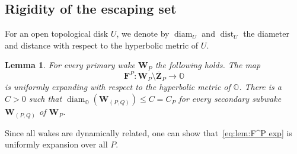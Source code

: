 \documentclass{amsart}
\newcommand{\1}{{\mathbb 1 }}
\newcommand{\bO}{{\mathbb{O}}}
\newcommand{\bF}{{\mathbf F}}
\newcommand{\bZ}{{\mathbf Z}}
\newcommand{\bW}{{\mathbf W}}
\newtheorem{lem}[thm]{Lemma}
\theoremstyle{remark}
\numberwithin{equation}{section}
\theoremstyle{definition}
\newcommand{\diam}{\operatorname{diam}}
\newcommand{\dist}{\operatorname{dist}}
\theoremstyle{nonumberbreak}
\begin{document}
\subsection{Rigidity of the escaping set} 
\label{ss:RigEscSet}
 For an open topological disk $U$, we denote by $\diam_U$ and $\dist_U$ the diameter and distance with respect to the hyperbolic metric of $U$. 
\begin{lem}
\label{lem:F^P exp}
For every primary wake $\bW_P$ the following holds. The map 
\begin{equation}
\label{eq:lem:F^P exp}
\bF^P\colon\bW_P\setminus \overline \bZ_P\to \bO
\end{equation}
 is uniformly expanding with respect to the hyperbolic metric of $\bO$. There is a $C>0$ such that $\diam_\bO(\bW_{(P,Q)})\le C=C_P$ for every secondary subwake $\bW_{(P,Q)}$ of $\bW_P$.
\end{lem}
\noindent Since all wakes are dynamically related, one can show that~\eqref{eq:lem:F^P exp} is uniformly expansion over all $P$. 
\end{document}
